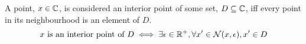 \begin{definition}
    A point, $x\in\mathbb{C}$, is considered an interior point of some set, $D\subseteq\mathbb{C}$, iff every point in its neighbourhood is an element of $D$.
    \begin{align}
        \text{$x$ is an interior point of $D$}\iff\exists\epsilon\in\mathbb{R}^+,\forall x'\in\mathcal{N}(x,\epsilon),x'\in D
    \end{align}
\end{definition}

